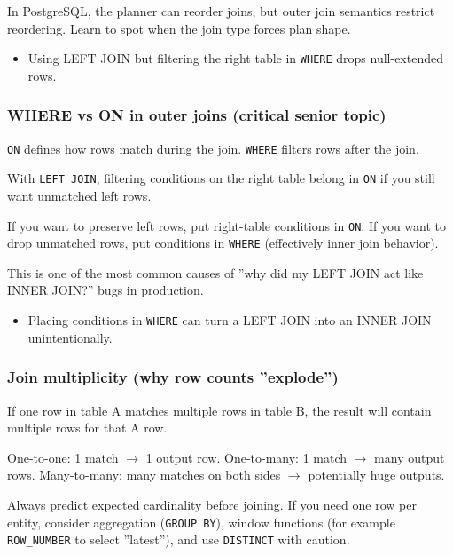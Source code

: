 \E In PostgreSQL, the planner can reorder joins, but outer join semantics restrict reordering. 
Learn to spot when the join type forces plan shape.

\Pitfall
\begin{itemize}
  \item Using LEFT JOIN but filtering the right table in \texttt{WHERE} drops null-extended rows.
\end{itemize}

\subsubsection{WHERE vs ON in outer joins (critical senior topic)}
\J \texttt{ON} defines how rows match during the join. \texttt{WHERE} filters rows after the join.

\M With \texttt{LEFT JOIN}, filtering conditions on the right table belong in \texttt{ON} if you 
still want unmatched left rows.

\Sx If you want to preserve left rows, put right-table conditions in \texttt{ON}. If you want 
to drop unmatched rows, put conditions in \texttt{WHERE} (effectively inner join behavior).

\E This is one of the most common causes of ''why did my LEFT JOIN act like INNER JOIN?'' bugs in 
production.

\newpage
\Pitfall
\begin{itemize}
  \item Placing conditions in \texttt{WHERE} can turn a LEFT JOIN into an INNER JOIN unintentionally.
\end{itemize}

\subsubsection{Join multiplicity (why row counts ''explode'')}
\J If one row in table A matches multiple rows in table B, the result will contain multiple rows 
for that A row.

\M One-to-one: 1 match $\rightarrow$ 1 output row. One-to-many: 1 match $\rightarrow$ many output 
rows. Many-to-many: many matches on both sides $\rightarrow$ potentially huge outputs.

\Sx Always predict expected cardinality before joining. If you need one row per entity, consider 
aggregation (\texttt{GROUP BY}), window functions (for example \texttt{ROW\_NUMBER} to select 
''latest''), and use \texttt{DISTINCT} with caution.

